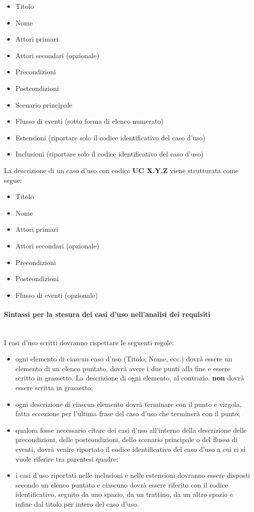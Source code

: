 \begin{itemize}
	\item Titolo
	\item Nome
	\item Attori primari
	\item Attori secondari (opzionale)
	\item Precondizioni
	\item Postcondizioni
	\item Scenario principale
	\item Flusso di eventi (sotto forma di elenco numerato)	
	\item Estensioni (riportare solo il codice identificativo del caso d’uso)
	\item Inclusioni (riportare solo il codice identificativo del caso d’uso)	
\end{itemize}
La descrizione di un caso d’uso con codice \textbf{UC X.Y.Z} viene strutturata come segue:
\begin{itemize}
	\item Titolo
	\item Nome
	\item Attori primari
	\item Attori secondari (opzionale)
	\item Precondizioni
	\item Postcondizioni
	\item Flusso di eventi (opzionale)	
\end{itemize}
\paragraph{Sintassi per la stesura dei casi d'uso nell'analisi dei requisiti}\mbox{}\\
I casi d'uso scritti dovranno rispettare le seguenti regole:
\begin{itemize}
	\item ogni elemento di ciascun caso d'uso (Titolo, Nome, ecc.) dovrà essere un elemento di un elenco puntato, dovrà avere i due punti alla fine e essere scritto in grassetto. La descrizione di ogni elemento, al contrario, \textbf{non} dovrà essere scritta in grassetto;
	\item ogni descrizione di ciascun elemento dovrà terminare con il punto e virgola, fatta eccezione per l'ultima frase del caso d'uso che terminerà con il punto;
	\item qualora fosse necessario citare dei casi d'uso all'interno della descrizione delle precondizioni, delle postcondizioni, dello scenario principale o del flusso di eventi, dovrà venire riportato il codice identificativo del caso d'uso a cui ci si vuole riferire tra parentesi quadre;
	\item i casi d'uso riportati nelle inclusioni e nelle estensioni dovranno essere disposti secondo un elenco puntato e ciascuno dovrà essere riferito con il codice identificativo, seguito da uno spazio, da un trattino, da un altro spazio e infine dal titolo per intero del caso d'uso.
\end{itemize}
